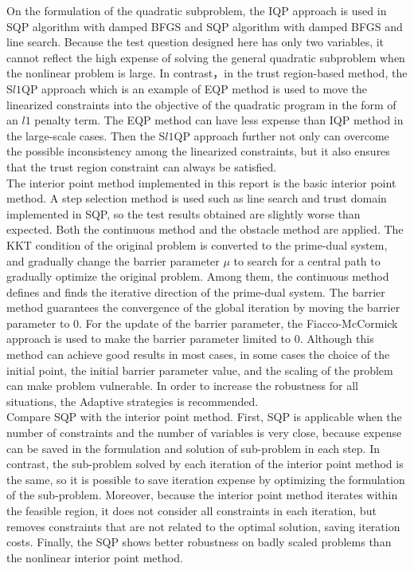 On the formulation of the quadratic subproblem, the IQP approach is used in SQP algorithm with damped BFGS and SQP algorithm with damped BFGS and line search. Because the test question designed here has only two variables, it cannot reflect the high expense of solving the general quadratic subproblem when the nonlinear problem is large. In contrast，in the trust region-based method, the S$l1$QP approach which is an example of EQP method is used to move the linearized constraints into the objective of the quadratic program in the form of an $l1$ penalty term.  The EQP method can have less expense than IQP method in the large-scale cases. Then the S$l1$QP approach further not only can overcome the possible inconsistency among the linearized constraints, but it also ensures that the trust region constraint can always be satisfied.\\

The interior point method implemented in this report is the basic interior point method. A step selection method is used such as line search and trust domain implemented in SQP, so the test results obtained are slightly worse than expected.
Both the continuous method and the obstacle method are applied. The KKT condition of the original problem is converted to the prime-dual system, and gradually change the barrier parameter $\mu$ to search for a central path to gradually optimize the original problem. Among them, the continuous method defines and finds the iterative direction of the prime-dual system. The barrier method guarantees the convergence of the global iteration by moving the barrier parameter to 0. For the update of the barrier parameter, the Fiacco-McCormick approach is used to make the barrier parameter limited to 0. Although this method can achieve good results in most cases, in some cases the choice of the initial point, the initial barrier parameter value, and the scaling of the problem can make problem vulnerable. In order to increase the robustness for all situations, the Adaptive strategies \cite{NoceWrig06} is recommended.\\

Compare SQP with the interior point method. First, SQP is applicable when the number of constraints and the number of variables is very close, because expense can be saved in the formulation and solution of sub-problem in each step. In contrast, the sub-problem solved by each iteration of the interior point method is the same, so it is possible to save iteration expense by optimizing the formulation of the sub-problem. Moreover, because the interior point method iterates within the feasible region, it does not consider all constraints in each iteration, but removes constraints that are not related to the optimal solution, saving iteration costs. Finally, the SQP shows better robustness on badly scaled problems than the nonlinear interior point method.

